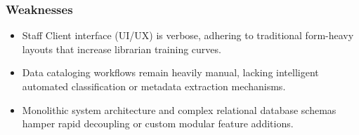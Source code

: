 \subsubsection{Weaknesses}
\begin{itemize}
\item Staff Client interface (UI/UX) is verbose, adhering to traditional form-heavy layouts that increase librarian training curves.
\item Data cataloging workflows remain heavily manual, lacking intelligent automated classification or metadata extraction mechanisms.
\item Monolithic system architecture and complex relational database schemas hamper rapid decoupling or custom modular feature additions.
\end{itemize}